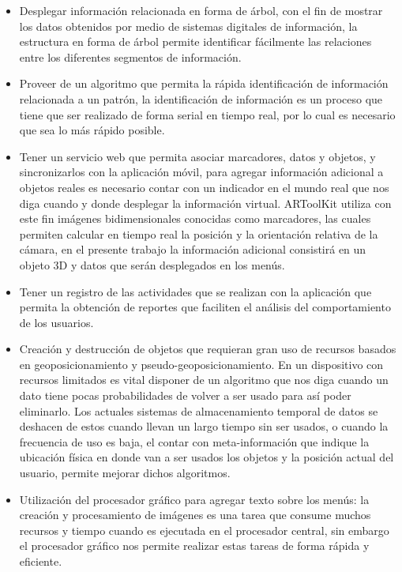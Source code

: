 \documentclass[12pt,a4paper,spanish,openany]{book}
\begin{document}
\begin{itemize}
  \item Desplegar información relacionada en
  forma de árbol, con el fin de mostrar los datos obtenidos por medio de
  sistemas digitales de información, la estructura en forma de
  árbol permite identificar fácilmente las relaciones entre los
  diferentes segmentos de información.
  \item Proveer de un algoritmo que permita la rápida identificación de
  información relacionada a un patrón, la identificación de información es un
  proceso que tiene que ser realizado de forma serial en tiempo real, por lo
  cual es necesario que sea lo más rápido posible.
 
 \item Tener un servicio web que permita asociar marcadores, datos y objetos,
 y sincronizarlos con la aplicación móvil, para agregar información adicional a
 objetos reales es necesario contar con un indicador en el mundo real que
 nos diga cuando y donde desplegar la información virtual. ARToolKit utiliza con
 este fin imágenes bidimensionales conocidas como marcadores, las cuales
 permiten calcular en tiempo real la posición y la orientación relativa de la
 cámara, en el presente trabajo la información adicional consistirá en un objeto
 3D y datos que serán desplegados en los menús.
 
 \item Tener un registro de las actividades que se realizan con la aplicación
 que permita la obtención de reportes que faciliten el análisis del
 comportamiento de los usuarios.
 
 \item Creación y destrucción de objetos que requieran gran uso de recursos
 basados en geoposicionamiento y pseudo-geoposicionamiento. En un dispositivo
 con recursos limitados es vital disponer de un algoritmo que nos diga
 cuando un dato tiene pocas probabilidades de volver a ser usado para así poder
 eliminarlo. Los actuales sistemas de almacenamiento temporal de datos se
 deshacen de estos cuando llevan un largo tiempo sin ser usados, o cuando la
 frecuencia de uso es baja, el contar con meta-información que indique la
 ubicación física en donde van a ser usados los objetos y la posición actual del
 usuario, permite mejorar dichos algoritmos.
 
 
 \item Utilización del procesador gráfico para agregar texto sobre los
 menús: la creación y procesamiento de imágenes es una tarea que consume muchos
 recursos y tiempo cuando es ejecutada en el procesador central, sin embargo el
 procesador gráfico nos permite realizar estas tareas de forma rápida y
 eficiente.
  
\end{itemize}
\end{document}
